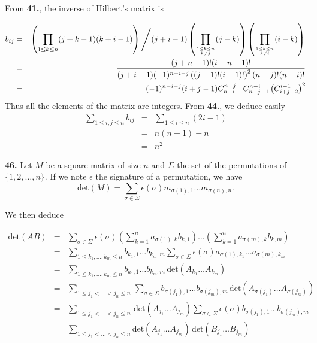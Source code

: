 \documentclass[a4paper,12pt]{article}
\newcommand{\newpar}[1]{\bigskip \noindent \textbf{#1.}}
\begin{document}
From \textbf{41.}, the inverse of Hilbert's matrix is

\begin{eqnarray*}
  b_{ij} &=& \left( \prod_{1\le k\le n}(j + k - 1)(k + i - 1)\right)
  \left/(j+i-1)\left(\prod_{1\le k \le n\atop k \not= j}(j-k)\right)
  \left(\prod_{1\le k\le n\atop k \not= i}(i-k)\right)\right. \\ &=&
  \frac{(j+n-1)!(i+n-1)!}
       {(j+i-1)(-1)^{n-i-j}\left((j-1)!(i-1)!\right)^2(n-j)!(n-i)!}
  \\ &=&
  (-1)^{n-i-j} (i+j-1) C_{n+i-1}^{n-j} C_{n+j-1}^{n-i}
  \left(C_{i+j-2}^{i-1}\right)^2
\end{eqnarray*}
Thus all the elements of the matrix are integers.  From \textbf{44.},
we deduce easily
\begin{eqnarray*}
  \sum_{1\le i,j\le n}b_{ij} &=& \sum_{1\le i\le n}(2i-1) \\
  &=& n(n+1) - n \\
  &=& n^2
\end{eqnarray*}

\newpar{46} Let $M$ be a square matrix of size $n$ and $\Sigma$ the
set of the permutations of $\{1,2,\ldots,n\}$.  If we note $\epsilon$
the signature of a permutation, we have
\[ \mathrm{det}(M) = \sum_{\sigma \in \Sigma} \epsilon(\sigma)
m_{\sigma(1),1} \ldots m_{\sigma(n),n}.\]

We then deduce

\begin{eqnarray*}
  \mathrm{det}(AB) &=& \sum_{\sigma \in \Sigma} \epsilon(\sigma)
  \left(\sum_{k=1}^n a_{\sigma(1),k}b_{k,1}\right)\ldots
  \left(\sum_{k=1}^n a_{\sigma(m),k}b_{k,m}\right) \\ &=&
  \sum_{1\le k_1,\ldots,k_m\le n} b_{k_1,1}\ldots
  b_{k_m,m}\sum_{\sigma \in \Sigma}
  \epsilon(\sigma)a_{\sigma(1),k_1}\ldots a_{\sigma(m),k_m} \\ &=&
  \sum_{1\le k_1,\ldots,k_m\le n} b_{k_1,1}\ldots b_{k_m,m}\,
  \mathrm{det}(A_{k_1}\ldots A_{k_m}) \\ &=&
  \sum_{1\le j_1 < \ldots < j_n \le n}\, \sum_{\sigma \in \Sigma}
  b_{\sigma(j_1),1}\ldots b_{\sigma(j_m),m}
  \,\mathrm{det}(A_{\sigma(j_1)}\ldots A_{\sigma(j_m)}) \\ &=&
  \sum_{1\le j_1 < \ldots < j_n \le n}\,\mathrm{det}(A_{j_1}\ldots
  A_{j_m}) \sum_{\sigma \in \Sigma} \epsilon(\sigma) b_{\sigma(j_1),1}
  \ldots b_{\sigma(j_m),m} \\ &=&
  \sum_{1\le j_1 < \ldots < j_n \le n} \mathrm{det}(A_{j_1}\ldots
  A_{j_m})\,\mathrm{det}(B_{j_1}\ldots B_{j_m})
\end{eqnarray*}
\end{document}
